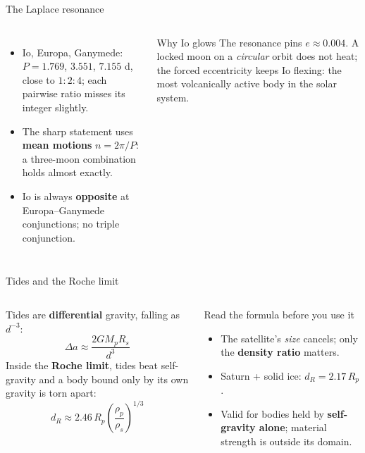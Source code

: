 \documentclass[aspectratio=169, 11pt]{beamer}
\begin{document}
\begin{frame}{The Laplace resonance}
  \begin{columns}[T]
    \begin{itemize}
      \item Io, Europa, Ganymede: $P = 1.769$, $3.551$, $7.155$ d, close to $1:2:4$; each pairwise ratio misses its integer slightly.
      \item The sharp statement uses \textbf{mean motions} $n = 2\pi/P$: a three-moon combination holds almost exactly.
      \item Io is always \textbf{opposite} at Europa--Ganymede conjunctions; no triple conjunction.
    \end{itemize}

    \begin{block}{Why Io glows}
      The resonance pins $e \approx 0.004$. A locked moon on a \emph{circular} orbit does not heat; the forced eccentricity keeps Io flexing: the most volcanically active body in the solar system.
    \end{block}
  \end{columns}
  \vskip0pt\relax
\end{frame}

\begin{frame}{Tides and the Roche limit}
  \begin{columns}[T]
    Tides are \textbf{differential} gravity, falling as $d^{-3}$:
    \[
      \Delta a \approx \frac{2 G M_p R_s}{d^3}
    \]
    Inside the \textbf{Roche limit}, tides beat self-gravity and a body bound only by its own gravity is torn apart:
    \[
      d_R \approx 2.46\,R_p \left(\frac{\rho_p}{\rho_s}\right)^{1/3}
    \]

    \begin{block}{Read the formula before you use it}
      \begin{itemize}
        \item The satellite's \emph{size} cancels; only the \textbf{density ratio} matters.
        \item Saturn + solid ice: $d_R = 2.17\,R_p$.
        \item Valid for bodies held by \textbf{self-gravity alone}; material strength is outside its domain.
      \end{itemize}
    \end{block}
  \end{columns}
  \vskip0pt\relax
\end{frame}
\end{document}
